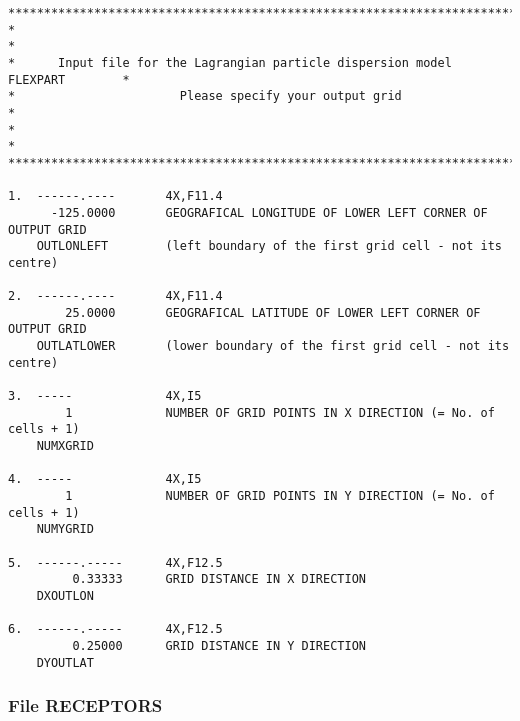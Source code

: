 \documentclass{egu}            %
\begin{document}
\begin{scriptsize}\begin{verbatim}
********************************************************************************
*                                                                              *
*      Input file for the Lagrangian particle dispersion model FLEXPART        *
*                       Please specify your output grid                        *
*                                                                              *
********************************************************************************

1.  ------.----       4X,F11.4
      -125.0000       GEOGRAFICAL LONGITUDE OF LOWER LEFT CORNER OF OUTPUT GRID
    OUTLONLEFT        (left boundary of the first grid cell - not its centre)

2.  ------.----       4X,F11.4
        25.0000       GEOGRAFICAL LATITUDE OF LOWER LEFT CORNER OF OUTPUT GRID
    OUTLATLOWER       (lower boundary of the first grid cell - not its centre)

3.  -----             4X,I5
        1             NUMBER OF GRID POINTS IN X DIRECTION (= No. of cells + 1)
    NUMXGRID

4.  -----             4X,I5
        1             NUMBER OF GRID POINTS IN Y DIRECTION (= No. of cells + 1)
    NUMYGRID

5.  ------.-----      4X,F12.5
         0.33333      GRID DISTANCE IN X DIRECTION
    DXOUTLON

6.  ------.-----      4X,F12.5
         0.25000      GRID DISTANCE IN Y DIRECTION
    DYOUTLAT
\end{verbatim}\end{scriptsize}

\newpage

\subsubsection{File RECEPTORS}
\end{document}
